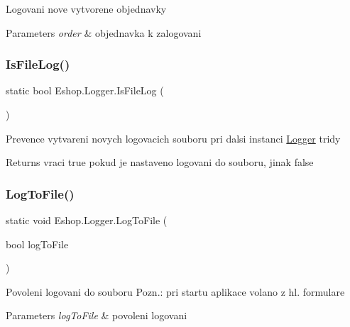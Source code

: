 Logovani nove vytvorene objednavky 


\begin{DoxyParams}{Parameters}
{\em order} & objednavka k zalogovani\\
\hline
\end{DoxyParams}
\mbox{\label{class_eshop_1_1_logger_a832a728edf66096ec757eecf323dc8b5}} 
\subsubsection{\texorpdfstring{IsFileLog()}{IsFileLog()}}
{\footnotesize\ttfamily static bool Eshop.\+Logger.\+Is\+File\+Log (\begin{DoxyParamCaption}{ }\end{DoxyParamCaption})\hspace{0.3cm}{\ttfamily [static]}}



Prevence vytvareni novych logovacich souboru pri dalsi instanci \mbox{\hyperlink{class_eshop_1_1_logger}{Logger}} tridy 

\begin{DoxyReturn}{Returns}
vraci true pokud je nastaveno logovani do souboru, jinak false
\end{DoxyReturn}
\mbox{\label{class_eshop_1_1_logger_ab21c57ec7099cbb095b4f289bdc15676}} 
\subsubsection{\texorpdfstring{LogToFile()}{LogToFile()}}
{\footnotesize\ttfamily static void Eshop.\+Logger.\+Log\+To\+File (\begin{DoxyParamCaption}\item[{bool}]{log\+To\+File }\end{DoxyParamCaption})\hspace{0.3cm}{\ttfamily [static]}}



Povoleni logovani do souboru Pozn.\+: pri startu aplikace volano z hl. formulare 


\begin{DoxyParams}{Parameters}
{\em log\+To\+File} & povoleni logovani\\
\hline
\end{DoxyParams}
\mbox{\label{class_eshop_1_1_logger_a9643291c2f9db09c69dd48524f8ec123}} 
